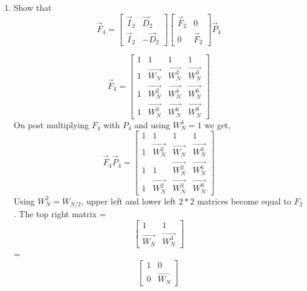 \documentclass[journal,12pt,twocolumn]{IEEEtran}
\renewcommand\thesection{\arabic{section}}
\begin{document}
\begin{enumerate}[label=\arabic*.,ref=\thesection.\theenumi]
    \item Show that 
\begin{equation}
	\vec{F}_{4}=
\begin{bmatrix}
	\vec{I}_{2} & \vec{D}_{2} \\
\vec{I}_{2} & -\vec{D}_{2}
\end{bmatrix}
\begin{bmatrix}
\vec{F}_{2} & 0 \\
0 & \vec{F}_{2}
\end{bmatrix}
\vec{P}_{4}
\end{equation}
\begin{solution}
	\begin{equation}
	\vec{F}_{4}=
	\begin{bmatrix}
		1 & 1 & 1 & 1 \\
		1 & \vec{W_{N}} & \vec{W_{N}^{2}} & \vec{W_{N}^{3}}\\
		1 & \vec{W_{N}^{2}} & \vec{W_{N}^{4}} & \vec{W_{N}^{6}}\\
		1 & \vec{W_{N}^{3}} & \vec{W_{N}^{6}} & \vec{W_{N}^{9}}
	\end{bmatrix}
\end{equation}
On post multiplying $F_{4}$ with $P_{4}$  and using $W_{N}^{4} = 1$ we get,
\begin{equation}
	\vec{F}_{4}\vec{P}_{4}=
	\begin{bmatrix}
		1 & 1 & 1 & 1 \\
		1 & \vec{W_{N}^2} & \vec{W_{N}} & \vec{W_{N}^{3}}\\
		1 & 1 & \vec{W_{N}^{2}} & \vec{W_{N}^{6}}\\
		1 & \vec{W_{N}^{2}} & \vec{W_{N}^{3}} & \vec{W_{N}^{9}}
	\end{bmatrix}
\end{equation}
Using $W_{N}^{2} = W_{N/2}$, upper left and lower left $2*2$ matrices
become equal to $F_{2}$. The top right matrix =
\begin{equation}
	\begin{bmatrix}
		1 & 1 \\
		\vec{W_{N}} & \vec{W_{N}^{3}}
	\end{bmatrix}
\end{equation}
=
\begin{equation}
	\begin{bmatrix}
		1 & 0 \\
		0 & \vec{W_{N}}
	\end{bmatrix}

\end{equation}
\end{solution}
\end{enumerate}
\end{document}
